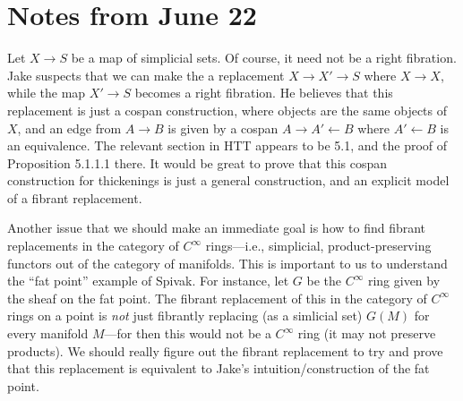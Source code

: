 

\section{Notes from June 22}

Let $X \to S$ be a map of simplicial sets. Of course, it need not be a right fibration. Jake suspects that we can make the a replacement $X \to X' \to S$ where $X \to X$, while the map $X' \to S$ becomes a right fibration. He believes that this replacement is just a cospan construction, where objects are the same objects of $X$, and an edge from $A \to B$ is given by a cospan $A \to A' \leftarrow B$ where $A' \leftarrow B$ is an equivalence. The relevant section in HTT appears to be 5.1, and the proof of Proposition 5.1.1.1 there. It would be great to prove that this cospan construction for thickenings is just a general construction, and an explicit model of a fibrant replacement.

Another issue that we should make an immediate goal is how to find fibrant replacements in the category of $C^\infty$ rings---i.e., simplicial, product-preserving functors out of the category of manifolds. This is important to us to understand the ``fat point'' example of Spivak. For instance, let $G$ be the $C^\infty$ ring given by the sheaf on the fat point. The fibrant replacement of this in the category of $C^\infty$ rings on a point is {\em not} just fibrantly replacing (as a simlicial set) $G(M)$ for every manifold $M$---for then this would not be a $C^\infty$ ring (it may not preserve products). We should really figure out the fibrant replacement to try and prove that this replacement is equivalent to Jake's intuition/construction of the fat point.
